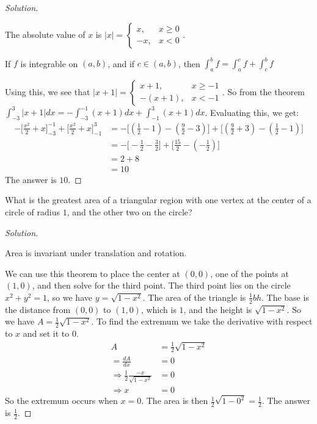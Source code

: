 \documentclass[crop=false,class=book,oneside]{standalone}
\begin{document}
\begin{proof}[Solution]
\begin{definition*}
The absolute value of $x$ is $|x| = \begin{cases}x, & x\geq 0 \\ -x, & x<0\end{cases}$.
\end{definition*}
\begin{theorem*}
If $f$ is integrable on $(a,b)$, and if $c\in (a,b)$, then $\int_{a}^{b} f = \int_{a}^{c}f + \int_{c}^{b} f$
\end{theorem*}
Using this, we see that $|x+1| = \begin{cases} x+1, & x\geq -1 \\ -(x+1), & x < -1\end{cases}$. So from the theorem $\int_{-3}^{3}|x+1|dx = -\int_{-3}^{-1}(x+1)dx + \int_{-1}^{3}(x+1)dx$. Evaluating this, we get:
\begin{align*}
    -\bigg[\frac{x^2}{2}+x\bigg]_{-3}^{-1}+\bigg[\frac{x^2}{2}+x\bigg]_{-1}^{3}&=-\bigg[(\frac{1}{2}-1)-(\frac{9}{2}-3)\bigg]+\bigg[(\frac{9}{2}+3)-(\frac{1}{2}-1)\bigg]\\
    &=-\bigg[-\frac{1}{2}-\frac{3}{2}\bigg]+\bigg[\frac{15}{2}-(-\frac{1}{2})\bigg]\\
    &=2+8\\ 
    &=10
\end{align*}
The answer is $10$.
\end{proof}
\begin{problem}
What is the greatest area of a triangular region with one vertex at the center of a circle of radius $1$, and the other two on the circle?
\end{problem}
\begin{proof}[Solution]
\begin{theorem*}
Area is invariant under translation and rotation.
\end{theorem*}
We can use this theorem to place the center at $(0,0)$, one of the points at $(1,0)$, and then solve for the third point. The third point lies on the circle $x^2+y^2 = 1$, so we have $y = \sqrt{1-x^2}$. The area of the triangle is $\frac{1}{2}bh$. The base is the distance from $(0,0)$ to $(1,0)$, which is $1$, and the height is $\sqrt{1-x^2}$. So we have $A = \frac{1}{2}\sqrt{1-x^2}$. To find the extremum we take the derivative with respect to $x$ and set it to $0$.
\begin{align*}
    A&=\frac{1}{2}\sqrt{1-x^{2}}\\
    =\frac{dA}{dx}&=0\\
    \Rightarrow\frac{1}{2}\frac{-x}{\sqrt{1-x^{2}}}&=0\\
    \Rightarrow x&=0
\end{align*}
So the extremum occurs when $x=0$. The area is then $\frac{1}{2}\sqrt{1-0^2} = \frac{1}{2}$. The answer is $\frac{1}{2}$.
\end{proof}
\end{document}
